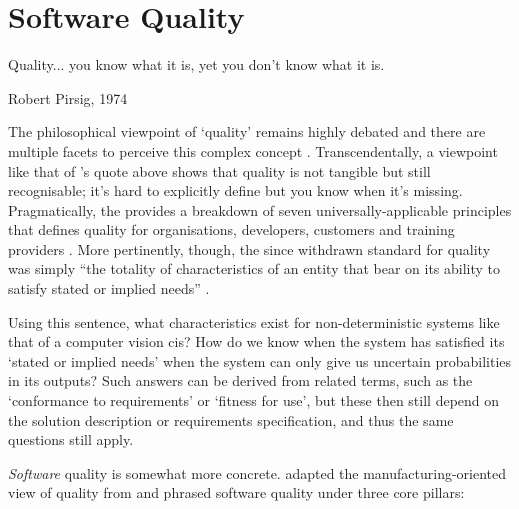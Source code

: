 \section{Software Quality}
\label{sec:lit-review:software-quality}

\epigraph{Quality... you know what it is, yet you don't know what it is.}{Robert Pirsig, 1974 \citep{Pirsig:1974vs}}

\noindent
The philosophical viewpoint of `quality' remains highly debated and there are multiple facets to perceive this complex concept . Transcendentally, a viewpoint like that of \citeauthor{Pirsig:1974vs}'s quote above shows that quality is not tangible but still recognisable; it's hard to explicitly define but you know when it's missing. Pragmatically, the \citeauthor{ISO8402:1986} provides a breakdown of seven universally-applicable principles that defines quality for organisations, developers, customers and training providers \citep{ISO9000:2015}. More pertinently, though, the since withdrawn \citeyear{ISO8402:1986} standard for quality was simply ``the totality of characteristics of an entity that bear on its ability to satisfy stated or implied needs'' \citep{ISO8402:1986}.

Using this sentence, what characteristics exist for non-deterministic systems like that of a computer vision \gls{cis}? How do we know when the system has satisfied its `stated or implied needs' when the system can only give us uncertain probabilities in its outputs? Such answers can be derived from related terms, such as the `conformance to requirements' or `fitness for use', but these then still depend on the solution description or requirements specification, and thus the same questions still apply.

\textit{Software} quality is somewhat more concrete. \citet{Pressman:2005vf} adapted the manufacturing-oriented view of quality from  and phrased software quality under three core pillars:

